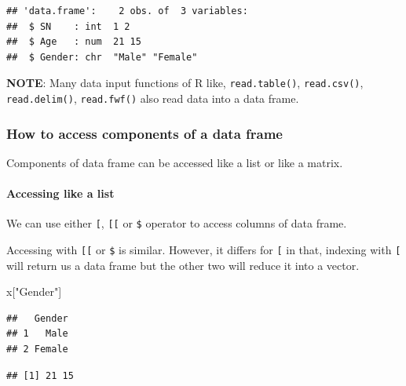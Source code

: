 \documentclass[
]{book}
\newenvironment{Shaded}{\begin{snugshade}}{\end{snugshade}}
\newcommand{\NormalTok}[1]{#1}
\newcommand{\SpecialCharTok}[1]{\textcolor[rgb]{0.00,0.00,0.00}{#1}}
\newcommand{\StringTok}[1]{\textcolor[rgb]{0.31,0.60,0.02}{#1}}
\begin{document}
\begin{verbatim}
## 'data.frame':    2 obs. of  3 variables:
##  $ SN    : int  1 2
##  $ Age   : num  21 15
##  $ Gender: chr  "Male" "Female"
\end{verbatim}

\textbf{NOTE}: Many data input functions of R like, \texttt{read.table()}, \texttt{read.csv()}, \texttt{read.delim()}, \texttt{read.fwf()} also read data into a data frame.

\hypertarget{how-to-access-components-of-a-data-frame}{%
\subsubsection{How to access components of a data frame}\label{how-to-access-components-of-a-data-frame}}

Components of data frame can be accessed like a list or like a matrix.

\hypertarget{accessing-like-a-list}{%
\paragraph{Accessing like a list}\label{accessing-like-a-list}}

We can use either \texttt{{[}}, \texttt{{[}{[}} or \texttt{\$} operator to access columns of data frame.

Accessing with \texttt{{[}{[}} or \texttt{\$} is similar. However, it differs for \texttt{{[}} in that, indexing with \texttt{{[}} will return us a data frame but the other two will reduce it into a vector.

\begin{Shaded}
\begin{Highlighting}[]
\NormalTok{x[}\StringTok{"Gender"}\NormalTok{]}
\end{Highlighting}
\end{Shaded}

\begin{verbatim}
##   Gender
## 1   Male
## 2 Female
\end{verbatim}

\begin{Shaded}
\end{Shaded}

\begin{verbatim}
## [1] 21 15
\end{verbatim}
\end{document}
